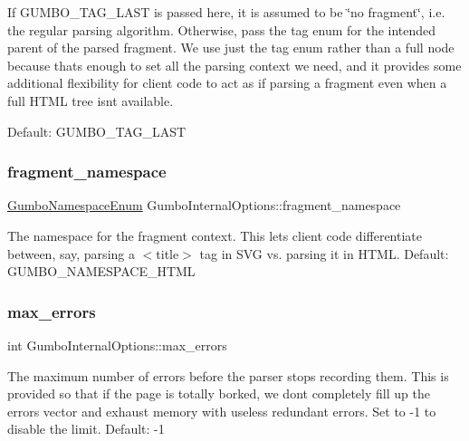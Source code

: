 If G\+U\+M\+B\+O\+\_\+\+T\+A\+G\+\_\+\+L\+A\+ST is passed here, it is assumed to be \char`\"{}no fragment\char`\"{}, i.\+e. the regular parsing algorithm. Otherwise, pass the tag enum for the intended parent of the parsed fragment. We use just the tag enum rather than a full node because that\textquotesingle{}s enough to set all the parsing context we need, and it provides some additional flexibility for client code to act as if parsing a fragment even when a full H\+T\+ML tree isn\textquotesingle{}t available.

Default\+: G\+U\+M\+B\+O\+\_\+\+T\+A\+G\+\_\+\+L\+A\+ST \mbox{\label{struct_gumbo_internal_options_aacbd6eac053b48200595fea13abec223}} 
\subsubsection{\texorpdfstring{fragment\+\_\+namespace}{fragment\_namespace}}
{\footnotesize\ttfamily \mbox{\hyperlink{gumbo_8h_a5792dfd02513e421fb8f083f08e58cc6}{Gumbo\+Namespace\+Enum}} Gumbo\+Internal\+Options\+::fragment\+\_\+namespace}

The namespace for the fragment context. This lets client code differentiate between, say, parsing a $<$title$>$ tag in S\+VG vs. parsing it in H\+T\+ML. Default\+: G\+U\+M\+B\+O\+\_\+\+N\+A\+M\+E\+S\+P\+A\+C\+E\+\_\+\+H\+T\+ML \mbox{\label{struct_gumbo_internal_options_a3783862d2151c993cbc7b2243ade614d}} 
\subsubsection{\texorpdfstring{max\+\_\+errors}{max\_errors}}
{\footnotesize\ttfamily int Gumbo\+Internal\+Options\+::max\+\_\+errors}

The maximum number of errors before the parser stops recording them. This is provided so that if the page is totally borked, we don\textquotesingle{}t completely fill up the errors vector and exhaust memory with useless redundant errors. Set to -\/1 to disable the limit. Default\+: -\/1 \mbox{\label{struct_gumbo_internal_options_aa9ab039f1b40708234f78cf3f6e46bd7}} 
